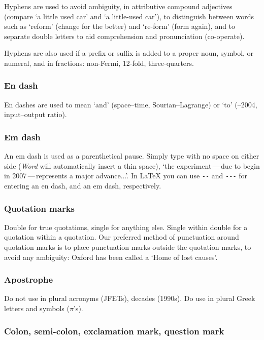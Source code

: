 \documentclass{cernrep}
\begin{document}
Hyphens are used to avoid ambiguity, \ie in attributive compound
adjectives (compare `a little used car' and `a little-used car'), to
distinguish between words such as `reform' (change for the better) and
`re-form' (form again), and to separate double letters to aid
comprehension and pronunciation (\eg co-operate).

Hyphens are also used if a prefix or suffix is added to a proper noun,
symbol, or numeral, and in fractions: \eg non-Fermi, 12-fold,
three-quarters.

\subsubsection{En dash}

En dashes are used to mean `and' (\eg space--time, Sourian--Lagrange)
or `to' (--2004, input--output ratio).

\subsubsection{Em dash}

An em dash is used as a parenthetical pause. Simply type with no space
on either side (\emph{Word} will automatically insert a thin space),
\eg `the experiment\,---\,due to begin in 2007\,---\,represents a
major advance...'. In \LaTeX{} you can use \texttt{{-}{-}} and
\texttt{{-}{-}{-}} for entering an en dash, and an em dash,
respectively.

\subsubsection{Quotation marks}

Double for true quotations, single for anything else. Single within
double for a quotation within a quotation. Our preferred method of
punctuation around quotation marks is to place punctuation marks
outside the quotation marks, to avoid any ambiguity: Oxford has been
called a `Home of lost causes'.


\subsubsection{Apostrophe}

Do not use in plural acronyms (\eg JFETs), decades (1990s).  Do use
in plural Greek letters and symbols (\eg $\pi$'s).

\subsubsection{Colon, semi-colon, exclamation mark, question mark}
\end{document}
